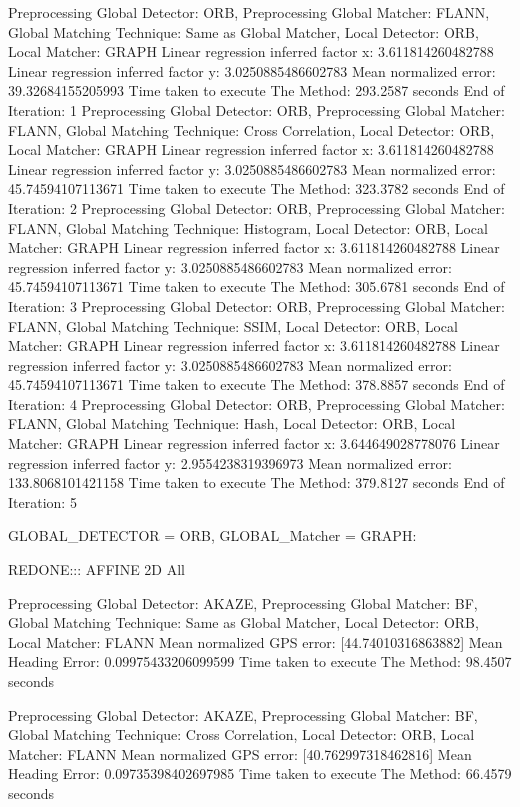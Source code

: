 Preprocessing Global Detector: ORB, Preprocessing Global Matcher: FLANN, Global Matching Technique: Same as Global Matcher, Local Detector: ORB, Local Matcher: GRAPH
Linear regression inferred factor x: 3.611814260482788
Linear regression inferred factor y: 3.0250885486602783
Mean normalized error: 39.32684155205993
Time taken to execute The Method: 293.2587 seconds
End of Iteration: 1
Preprocessing Global Detector: ORB, Preprocessing Global Matcher: FLANN, Global Matching Technique: Cross Correlation, Local Detector: ORB, Local Matcher: GRAPH
Linear regression inferred factor x: 3.611814260482788
Linear regression inferred factor y: 3.0250885486602783
Mean normalized error: 45.74594107113671
Time taken to execute The Method: 323.3782 seconds
End of Iteration: 2
Preprocessing Global Detector: ORB, Preprocessing Global Matcher: FLANN, Global Matching Technique: Histogram, Local Detector: ORB, Local Matcher: GRAPH
Linear regression inferred factor x: 3.611814260482788
Linear regression inferred factor y: 3.0250885486602783
Mean normalized error: 45.74594107113671
Time taken to execute The Method: 305.6781 seconds
End of Iteration: 3
Preprocessing Global Detector: ORB, Preprocessing Global Matcher: FLANN, Global Matching Technique: SSIM, Local Detector: ORB, Local Matcher: GRAPH
Linear regression inferred factor x: 3.611814260482788
Linear regression inferred factor y: 3.0250885486602783
Mean normalized error: 45.74594107113671
Time taken to execute The Method: 378.8857 seconds
End of Iteration: 4
Preprocessing Global Detector: ORB, Preprocessing Global Matcher: FLANN, Global Matching Technique: Hash, Local Detector: ORB, Local Matcher: GRAPH
Linear regression inferred factor x: 3.644649028778076
Linear regression inferred factor y: 2.9554238319396973
Mean normalized error: 133.8068101421158
Time taken to execute The Method: 379.8127 seconds
End of Iteration: 5


GLOBAL\_DETECTOR = ORB, GLOBAL\_Matcher = GRAPH:







REDONE::: 
AFFINE 2D All

Preprocessing Global Detector: AKAZE, Preprocessing Global Matcher: BF, Global Matching Technique: Same as Global Matcher, Local Detector: ORB, Local Matcher: FLANN
Mean normalized GPS error: [44.74010316863882]
Mean Heading Error: 0.09975433206099599
Time taken to execute The Method: 98.4507 seconds


Preprocessing Global Detector: AKAZE, Preprocessing Global Matcher: BF, Global Matching Technique: Cross Correlation, Local Detector: ORB, Local Matcher: FLANN
Mean normalized GPS error: [40.762997318462816]
Mean Heading Error: 0.09735398402697985
Time taken to execute The Method: 66.4579 seconds


